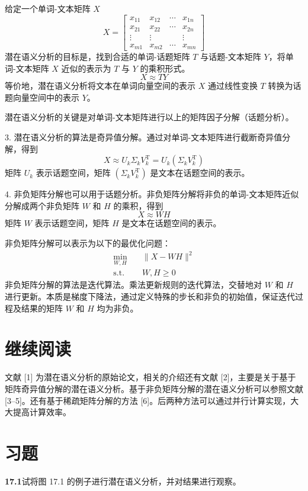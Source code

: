 \documentclass[UTF8, 12pt, fontset=fandol, oneside]{ctexart}
\begin{document}
给定一个单词-文本矩阵 $X$
\[
X=
\begin{bmatrix}
x_{11} & x_{12} & \cdots & x_{1n}\\
x_{21} & x_{22} & \cdots & x_{2n}\\
\vdots & \vdots & & \vdots\\
x_{m1} & x_{m2} & \cdots & x_{mn}
\end{bmatrix}
\]
潜在语义分析的目标是，找到合适的单词-话题矩阵 $T$ 与话题-文本矩阵 $Y$，将单词-文本矩阵 $X$ 近似的表示为 $T$ 与 $Y$ 的乘积形式。
\[
X\approx TY
\]
等价地，潜在语义分析将文本在单词向量空间的表示 $X$ 通过线性变换 $T$ 转换为话题向量空间中的表示 $Y$。

潜在语义分析的关键是对单词-文本矩阵进行以上的矩阵因子分解（话题分析）。

3. 潜在语义分析的算法是奇异值分解。通过对单词-文本矩阵进行截断奇异值分解，得到
\[
X\approx U_k\Sigma_kV_k^{\mathrm{T}}=U_k(\Sigma_kV_k^{\mathrm{T}})
\]
矩阵 $U_k$ 表示话题空间，矩阵 $(\Sigma_kV_k^{\mathrm{T}})$ 是文本在话题空间的表示。

4. 非负矩阵分解也可以用于话题分析。非负矩阵分解将非负的单词-文本矩阵近似分解成两个非负矩阵 $W$ 和 $H$ 的乘积，得到
\[
X\approx WH
\]
矩阵 $W$ 表示话题空间，矩阵 $H$ 是文本在话题空间的表示。

非负矩阵分解可以表示为以下的最优化问题：
\[
\begin{aligned}
\min_{W,H}\quad &\|X-WH\|^2\\
\text{s.t.}\quad &W,H\geqslant 0
\end{aligned}
\]
非负矩阵分解的算法是迭代算法。乘法更新规则的迭代算法，交替地对 $W$ 和 $H$ 进行更新。本质是梯度下降法，通过定义特殊的步长和非负的初始值，保证迭代过程及结果的矩阵 $W$ 和 $H$ 均为非负。

\section*{继续阅读}

文献 [1] 为潜在语义分析的原始论文，相关的介绍还有文献 [2]，主要是关于基于矩阵奇异值分解的潜在语义分析。基于非负矩阵分解的潜在语义分析可以参照文献 [3--5]。还有基于稀疏矩阵分解的方法 [6]。后两种方法可以通过并行计算实现，大大提高计算效率。

\section*{习题}

\noindent\textbf{17.1}\quad 试将图 17.1 的例子进行潜在语义分析，并对结果进行观察。
\end{document}

